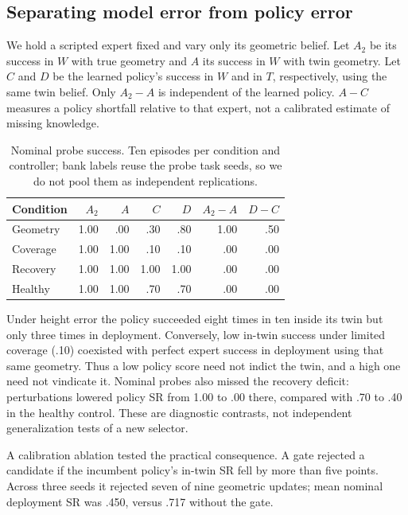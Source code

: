 \subsection{Separating model error from policy error}
We hold a scripted expert fixed and vary only its geometric belief. Let $A_2$ be its success in $W$ with true geometry and $A$ its success in $W$ with twin geometry. Let $C$ and $D$ be the learned policy's success in $W$ and in $T$, respectively, using the same twin belief. Only $A_2-A$ is independent of the learned policy. $A-C$ measures a policy shortfall relative to that expert, not a calibrated estimate of missing knowledge.
\begin{table}[t]
\centering\caption{Nominal probe success. Ten episodes per condition and controller; bank labels reuse the probe task seeds, so we do not pool them as independent replications.}\label{tab:probe}
\begin{tabular}{@{}lrrrrrr@{}}\toprule
Condition & $A_2$ & $A$ & $C$ & $D$ & $A_2-A$ & $D-C$\\\midrule
Geometry & 1.00 & .00 & .30 & .80 & 1.00 & .50\\
Coverage & 1.00 & 1.00 & .10 & .10 & .00 & .00\\
Recovery & 1.00 & 1.00 & 1.00 & 1.00 & .00 & .00\\
Healthy & 1.00 & 1.00 & .70 & .70 & .00 & .00\\\bottomrule
\end{tabular}
\end{table}
Under height error the policy succeeded eight times in ten inside its twin but only three times in deployment. Conversely, low in-twin success under limited coverage (.10) coexisted with perfect expert success in deployment using that same geometry. Thus a low policy score need not indict the twin, and a high one need not vindicate it. Nominal probes also missed the recovery deficit: perturbations lowered policy SR from 1.00 to .00 there, compared with .70 to .40 in the healthy control. These are diagnostic contrasts, not independent generalization tests of a new selector.

A calibration ablation tested the practical consequence. A gate rejected a candidate if the incumbent policy's in-twin SR fell by more than five points. Across three seeds it rejected seven of nine geometric updates; mean nominal deployment SR was .450, versus .717 without the gate.

